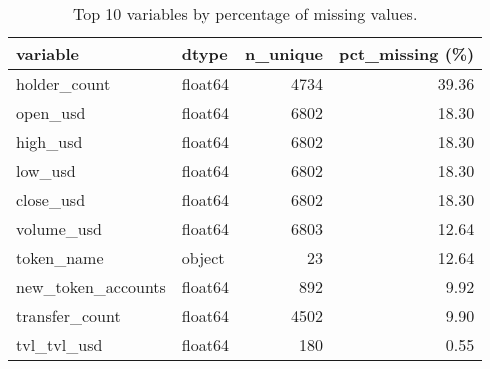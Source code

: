 \begin{table}
\centering
\caption{Top 10 variables by percentage of missing values.}
\label{tbl:app-missing-top10}
\begin{tabular}{llrr}
\toprule
          variable &   dtype &  n\_unique &  pct\_missing (\%) \\
\midrule
      holder\_count & float64 &      4734 &            39.36 \\
          open\_usd & float64 &      6802 &            18.30 \\
          high\_usd & float64 &      6802 &            18.30 \\
           low\_usd & float64 &      6802 &            18.30 \\
         close\_usd & float64 &      6802 &            18.30 \\
        volume\_usd & float64 &      6803 &            12.64 \\
        token\_name &  object &        23 &            12.64 \\
new\_token\_accounts & float64 &       892 &             9.92 \\
    transfer\_count & float64 &      4502 &             9.90 \\
       tvl\_tvl\_usd & float64 &       180 &             0.55 \\
\bottomrule
\end{tabular}
\end{table}
